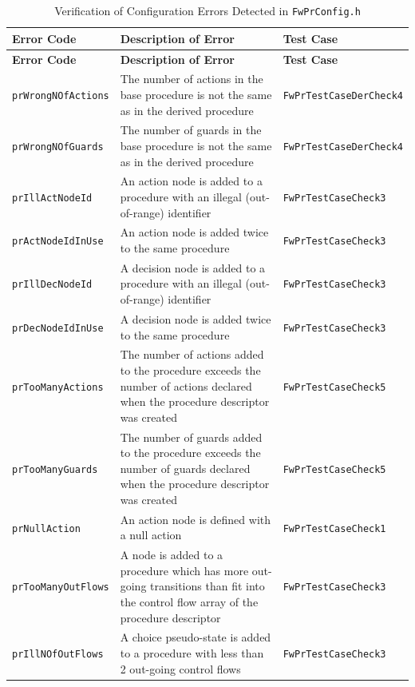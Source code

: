 \documentclass[a4paper,10pt]{article}
\begin{document}
\begin{longtable}{|p{3cm}|p{3.7cm}|p{4.5cm}|}
\caption{Verification of Configuration Errors Detected in \texttt{FwPrConfig.h}}
\label{tab:PR_Config_Error} \\
\hline
\rowcolor{gray}
\textbf{Error Code} & \textbf{Description of Error} & \textbf{Test Case} \\
\hline
\endfirsthead
\rowcolor{gray}
\textbf{Error Code} & \textbf{Description of Error} & \textbf{Test Case} \\
\hline
\endhead
\texttt{prWrongNOfActions} & The number of actions in the base procedure is not the same as in the derived procedure & \texttt{FwPrTestCaseDerCheck4} \\
\hline
\texttt{prWrongNOfGuards} & The number of guards in the base procedure is not the same as in the derived procedure & \texttt{FwPrTestCaseDerCheck4} \\
\hline
\texttt{prIllActNodeId} & An action node is added to a procedure with an illegal (out-of-range) identifier & \texttt{FwPrTestCaseCheck3} \\
\hline
\texttt{prActNodeIdInUse} & An action node is added twice to the same procedure & \texttt{FwPrTestCaseCheck3} \\
\hline
\texttt{prIllDecNodeId} & A decision node is added to a procedure with an illegal (out-of-range) identifier & \texttt{FwPrTestCaseCheck3} \\
\hline
\texttt{prDecNodeIdInUse} & A decision node is added twice to the same procedure & \texttt{FwPrTestCaseCheck3} \\
\hline
\texttt{prTooManyActions} & The number of actions added to the procedure exceeds the number of actions declared when the procedure descriptor was created & \texttt{FwPrTestCaseCheck5} \\
\hline
\texttt{prTooManyGuards} & The number of guards added to the procedure exceeds the number of guards declared when the procedure descriptor was created & \texttt{FwPrTestCaseCheck5} \\
\hline
\texttt{prNullAction} & An action node is defined with a null action & \texttt{FwPrTestCaseCheck1} \\
\hline
\texttt{prTooManyOutFlows} & A node is added to a procedure which has more out-going transitions than fit into the control flow array of the procedure descriptor & \texttt{FwPrTestCaseCheck3} \\
\hline
\texttt{prIllNOfOutFlows} & A choice pseudo-state is added to a procedure with less than 2 out-going control flows & \texttt{FwPrTestCaseCheck3} \\

\end{longtable}
\end{document}
